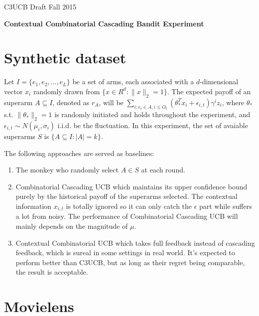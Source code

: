 \documentclass[a4paper,11pt]{article}
\begin{document}
C3UCB Draft \hfill Fall 2015

\vspace*{\baselineskip}

\begin{center}
  \textbf{Contextual Combinatorial Cascading Bandit Experiment}
\end{center}

\vspace*{2\baselineskip}

\section{Synthetic dataset}

Let $I=\{e_1,e_2,\dots,e_L\}$ be a set of arms, each associated with a $d$-dimensional vector $x_i$ randomly drawn from $\{x\in R^d : \|x\|_2=1\}$. The expected payoff of an superarm $A\subseteq I$, denoted as $r_A$, will be $\sum_{i:e_i\in A, i\leq O_t}{(\theta_\ast^Tx_i + \epsilon_{i,t})\gamma^i z_i}$, where $\theta_\ast$ s.t. $\|\theta_\ast\|_2=1$ is randomly initiated and holds throughout the experiment, and $\epsilon_{i,t}\sim N(\mu_i,\sigma_i)$ i.i.d. be the fluctuation. In this experiment, the set of avaiable superarms $S$ is $\{A\subseteq I:|A|=k\}$. 

The following approaches are served as baselines:

\begin{enumerate}

  \item The monkey who randomly select $A\in S$ at each round.

  \item Combinatorial Cascading UCB which maintains its upper confidence bound purely by the historical payoff of the superarms selected. The contextual information $x_{i,t}$ is totally ignored so it can only catch the $\epsilon$ part while suffers a lot from noisy. The performance of Combinatorial Cascading UCB will mainly depends on the magnitude of $\mu$.
  
  \item Contextual Combinatorial UCB which takes full feedback instead of cascading feedback, which is sureal in some settings in real world. It's expected to perform better than C3UCB, but as long as their regret being comparable, the result is acceptable.

\end{enumerate}

\section{Movielens}
\end{document}
